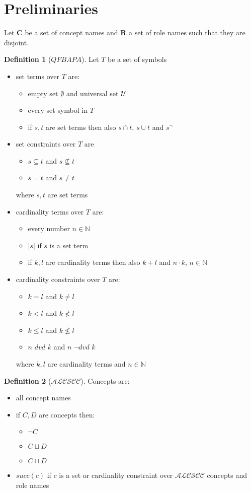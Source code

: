 \documentclass[a4paper,11pt]{scrartcl}
\theoremstyle{break}
\theoremstyle{definition}
\newtheorem{mydef}{Definition}
\begin{document}
\section{Preliminaries}
Let $\mathbf{C}$ be a set of concept names and $\mathbf{R}$ a set of role names such that they are disjoint.
\begin{mydef}[$QFBAPA$]
Let $T$ be a set of symbols
\begin{itemize}
\item set terms over $T$ are:
\begin{itemize}
\item empty set $\emptyset$ and universal set $
\mathcal{U}$
\item every set symbol in $T$
\item if $s,t$ are set terms then also $s\cap t$, $s\cup t$ and $s^{\neg}$
\end{itemize}
\item set constraints over $T$ are
\begin{itemize}
\item $s\subseteq t$ and $s\not\subseteq t$
\item $s=t$ and $s\neq t$
\end{itemize}
where $s,t$ are set terms
\item cardinality terms over $T$ are:
\begin{itemize}
\item every number $n\in \mathbb{N}$
\item $|s|$ if $s$ is a set term
\item if $k,l$ are cardinality terms then also $k+l$ and $n\cdot k$, $n\in \mathbb{N}$
\end{itemize}
\item cardinality constraints over $T$ are:
\begin{itemize}
\item $k=l$ and $k\neq l$
\item $k<l$ and $k\nless l$
\item $k\leq l$ and $k\not\leq l$
\item $n$ $dvd$ $k$ and $n$ $\neg dvd$ $k$
\end{itemize}
where $k,l$ are cardinality terms and $n\in\mathbb{N}$
\end{itemize}
\end{mydef}
\begin{mydef}[$\mathcal{ALCSCC}$]
Concepts are:
\begin{itemize}
\item all concept names
\item if $C,D$ are concepts then:
\begin{itemize}
\item $\neg C$
\item $C\sqcup D$
\item $C\sqcap D$
\end{itemize}
\item $succ(c)$ if $c$ is a set or cardinality constraint over $\mathcal{ALCSCC}$ concepts and role names
\end{itemize}
\end{mydef}
\end{document}

